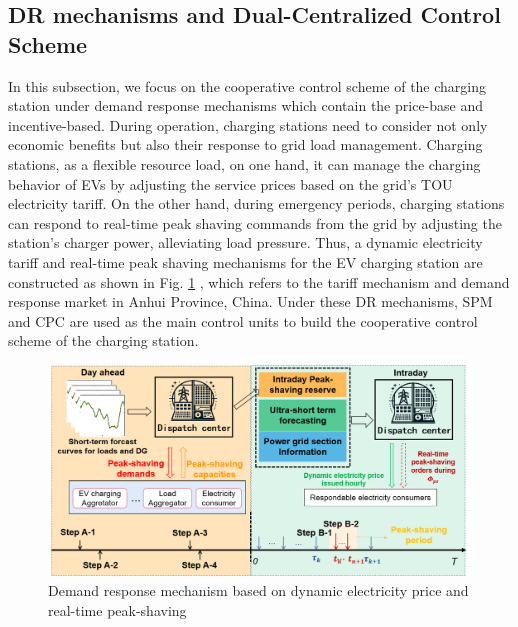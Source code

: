 \documentclass[preprint,12pt]{elsarticle}
\begin{document}
\subsection{DR mechanisms and Dual-Centralized Control Scheme}
In this subsection, we focus on the cooperative control scheme of the charging station under demand response mechanisms which contain the price-base and incentive-based. During operation, charging stations need to consider not only economic benefits but also their response to grid load management. Charging stations, as a flexible resource load, on one hand, it can manage the charging behavior of EVs by adjusting the service prices based on the grid's TOU electricity tariff. On the other hand, during emergency periods, charging stations can respond to real-time peak shaving commands from the grid by adjusting the station's charger power, alleviating load pressure. Thus, a dynamic electricity tariff and real-time peak shaving mechanisms for the EV charging station are constructed as shown in Fig. \ref{fig:Demand-response-mechanism} , which refers to the tariff mechanism and demand response market in Anhui Province, China. Under these DR mechanisms, SPM and CPC are used as the main control units to build the cooperative control scheme of the charging station. 
\begin{figure}
    \centering
    \includegraphics[width=1\linewidth]{figures/Demand respond.png}
    \caption{Demand response mechanism based on dynamic electricity price and real-time peak-shaving}
    \label{fig:Demand-response-mechanism}
\end{figure}
\end{document}

